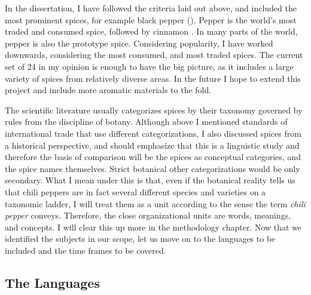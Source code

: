 
In the dissertation, I have followed the criteria laid out above, and included the most prominent spices, for example black pepper (). Pepper is the world's most traded and consumed spice, followed by cinnamon \autocite[16]{senaratne_cinnamon_2020}. In many parts of the world, pepper is also the prototype spice. Considering popularity, I have worked downwards, considering the most consumed, and most traded spices. The current set of 24 in my opinion is enough to have the big picture, as it includes a large variety of spices from relatively diverse areas. In the future I hope to extend this project and include more aromatic materials to the fold.

The scientific literature usually categorizes spices by their taxonomy governed by rules from the discipline of botany. Although above I mentioned standards of international trade that use different categorizations, I also discussed spices from a historical perspective, and should emphasize that this is a linguistic study and therefore the basis of comparison will be the spices as conceptual categories, and the spice names themselves. Strict botanical other categorizations would be only secondary. What I mean under this is that, even if the botanical reality tells us that chili peppers are in fact several different species and varieties on a taxonomic ladder, I will treat them as a unit according to the sense the term \textit{chili pepper} conveys. Therefore, the close organizational units are words, meanings, and concepts. I will clear this up more in the methodology chapter. Now that we identified the subjects in our scope, let us move on to the languages to be included and the time frames to be covered.


\subsection{The Languages}

